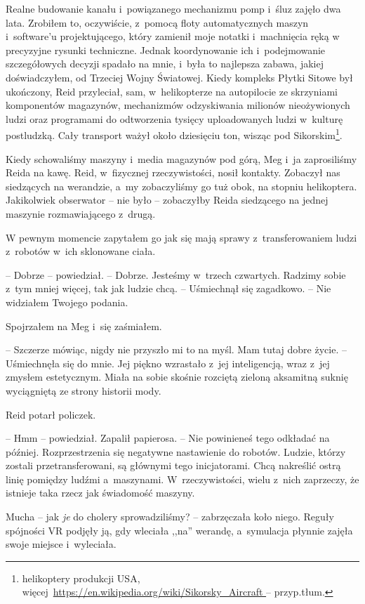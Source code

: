\documentclass[oneside,polish,11pt,sfheadings]{mwbk}
\begin{document}
Realne budowanie kanału i~powiązanego mechanizmu pomp i~śluz zajęło dwa
lata. Zrobiłem to, oczywiście, z~pomocą floty automatycznych maszyn i~software'u projektującego, który zamienił moje notatki i~machnięcia ręką
w precyzyjne rysunki techniczne. Jednak koordynowanie ich i~podejmowanie
szczegółowych decyzji spadało na mnie, i~była to najlepsza zabawa,
jakiej doświadczyłem, od Trzeciej Wojny Światowej. Kiedy kompleks Płytki
Sitowe był ukończony, Reid przyleciał, sam, w~helikopterze na
autopilocie ze skrzyniami komponentów magazynów, mechanizmów
odzyskiwania milionów nieożywionych ludzi oraz programami do odtworzenia
tysięcy uploadowanych ludzi w~kulturę postludzką. Cały transport ważył
około dziesięciu ton, wisząc pod Sikorskim\footnote{helikoptery produkcji
USA, więcej~\url{https://en.wikipedia.org/wiki/Sikorsky_Aircraft
} -- przyp.tłum.}. 

Kiedy schowaliśmy maszyny i~media magazynów pod górą, Meg i~ja
zaprosiliśmy Reida na kawę. Reid, w~fizycznej rzeczywistości, nosił
kontakty. Zobaczył nas siedzących na werandzie, a~my zobaczyliśmy go tuż
obok, na stopniu helikoptera. Jakikolwiek obserwator -- nie było -- zobaczyłby Reida siedzącego na jednej maszynie rozmawiającego z~drugą.

W pewnym momencie zapytałem go jak się mają sprawy z~transferowaniem
ludzi z~robotów w~ich sklonowane ciała.

-- Dobrze -- powiedział. -- Dobrze. Jesteśmy w~trzech czwartych. Radzimy
sobie z~tym mniej więcej, tak jak ludzie chcą. -- Uśmiechnął się
zagadkowo. -- Nie widziałem Twojego podania.

Spojrzałem na Meg i~się zaśmiałem. 

-- Szczerze mówiąc, nigdy nie przyszło
mi to na myśl. Mam tutaj dobre życie. -- Uśmiechnęła się do mnie. Jej
piękno wzrastało z~jej inteligencją, wraz z~jej zmysłem estetycznym.
Miała na sobie skośnie rozciętą zieloną aksamitną suknię wyciągniętą ze
strony historii mody.

Reid potarł policzek. 

-- Hmm -- powiedział. Zapalił papierosa. -- Nie
powinieneś tego odkładać na później. Rozprzestrzenia się negatywne
nastawienie do robotów. Ludzie, którzy zostali przetransferowani, są
głównymi tego inicjatorami. Chcą nakreślić ostrą linię pomiędzy ludźmi a~maszynami. W~rzeczywistości, wielu z~nich zaprzeczy, że istnieje taka
rzecz jak świadomość maszyny.

Mucha -- jak \emph{je} do cholery sprowadziliśmy? -- zabrzęczała koło
niego. Reguły spójności VR podjęły ją, gdy wleciała ,,na'' werandę, a~symulacja płynnie zajęła swoje miejsce i~wyleciała.
\end{document}
